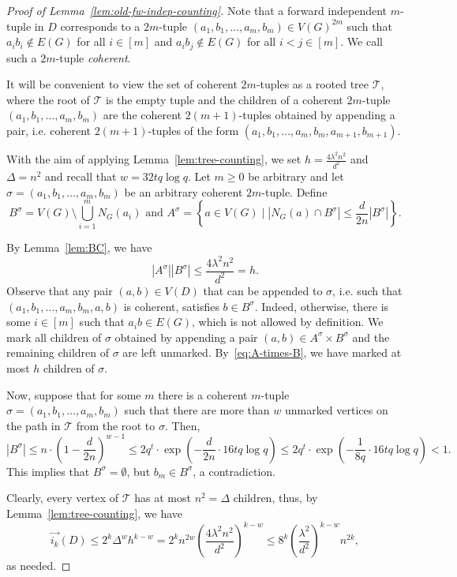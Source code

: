 \documentclass{article}
\theoremstyle{plain}
\theoremstyle{definition}
\newcommand{\cT}{\mathcal{T}}
\newcommand{\fwi}[1]{\overrightarrow{i_{#1}}}
\begin{document}
\begin{proof}[Proof of Lemma~\ref{lem:old-fw-indep-counting}]
    Note that a forward independent $m$-tuple in $D$ corresponds to a $2m$-tuple $(a_1, b_1, \dots, a_m, b_m) \in V(G)^{2m}$ such that $a_i b_i \not \in E(G)$ for all $i \in [m]$ and $a_i b_j \not\in E(G)$ for all $i < j \in [m]$. We call such a $2m$-tuple \emph{coherent}.

    It will be convenient to view the set of coherent $2m$-tuples as a rooted tree $\cT$, where the root of $\cT$ is the empty tuple and the children of a coherent $2m$-tuple $(a_1, b_1, \dots, a_m, b_m)$ are the coherent $2(m+1)$-tuples obtained by appending a pair, i.e. coherent $2(m+1)$-tuples of the form $(a_1, b_1, \dots, a_m, b_m, a_{m+1}, b_{m+1})$.

    With the aim of applying Lemma~\ref{lem:tree-counting}, we set $h = \frac{4 \lambda^2 n^2}{d^2}$ and $\Delta = n^2$ and recall that $w = 32 t q \log q$. Let $m \ge 0$ be arbitrary and let $\sigma = (a_1, b_1, \dots, a_m, b_m)$ be an arbitrary coherent $2m$-tuple. Define 
    \[ B^\sigma= V(G) \setminus \bigcup_{i=1}^m N_G(a_i) \text{ and } A^\sigma = \left\{ a \in V(G) \mid |N_G(a) \cap B^\sigma| \le \frac{d}{2n} |B^\sigma| \right\}. \]

    By Lemma~\ref{lem:BC}, we have 
    \begin{equation} \label{eq:A-times-B}
        |A^\sigma||B^\sigma| \le \frac{4 \lambda^2 n^2}{d^2} = h.
    \end{equation}
    Observe that any pair $(a, b) \in V(D)$ that can be appended to $\sigma$, i.e. such that $(a_1, b_1, \dots, a_m, b_m, a, b)$ is coherent, satisfies $b \in B^\sigma$. Indeed, otherwise, there is some $i \in [m]$ such that $a_i b \in E(G)$, which is not allowed by definition. We mark all children of $\sigma$ obtained by appending a pair $(a, b) \in A^\sigma \times B^\sigma$ and the remaining children of $\sigma$ are left unmarked. By~\eqref{eq:A-times-B}, we have marked at most $h$ children of $\sigma$. 

    Now, suppose that for some $m$ there is a coherent $m$-tuple  $\sigma = (a_1, b_1, \dots, a_m, b_m)$ such that there are more than $w$ unmarked vertices on the path in $\cT$ from the root to $\sigma$. Then,
    \[ |B^\sigma| \le n \cdot \left( 1 - \frac{d}{2n}\right)^{w-1} \le 2 q^t \cdot \exp\left(- \frac{d}{2n} \cdot 16tq \log q \right) \le 2 q^t \cdot \exp\left( - \frac{1}{8q} \cdot 16t q \log q\right) < 1. \]
    This implies that $B^\sigma = \emptyset$, but $b_m \in B^\sigma$, a contradiction.

    Clearly, every vertex of $\cT$ has at most $n^2 = \Delta$ children, thus, by Lemma~\ref{lem:tree-counting}, we have
    \[ \fwi{k}(D) \le 2^k \Delta^w h^{k-w} = 2^k n^{2w} \left(\frac{4 \lambda^2 n^2}{d^2} \right)^{k-w} \le 8^k \left( \frac{\lambda^2}{d^2}\right)^{k-w} n^{2k}, \]
    as needed.
\end{proof}
\end{document}

